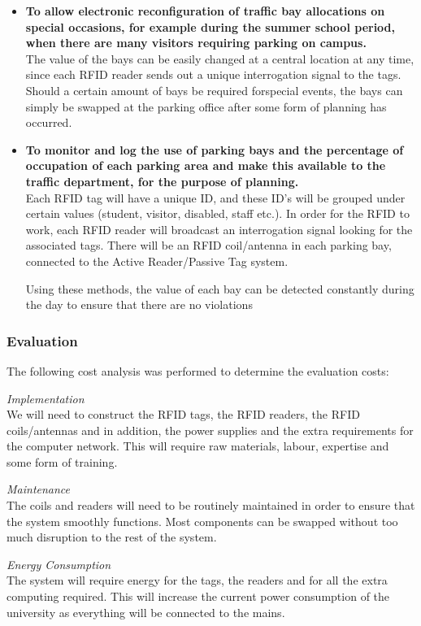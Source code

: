 \begin{itemize}
\item \textbf{To allow electronic reconfiguration  of  traffic  bay allocations on special occasions, for example during the summer school period, when there are many visitors requiring parking on campus.}\\
The value of the bays can be easily changed at a central location at any time, since each RFID reader
sends out a unique interrogation signal to the tags. Should a certain amount of bays be required forspecial events, the bays can simply be swapped at the parking office after some form of planning has
occurred.

\item \textbf{To monitor and log the use of parking bays and the percentage of occupation of each parking area and make this available to the traffic department, for the purpose of planning.}\\
Each RFID tag will have a unique ID, and these ID’s will be grouped under certain values (student,
visitor, disabled, staff etc.). In order for the RFID to work, each RFID reader will broadcast an
interrogation signal looking for the associated tags. There will be an RFID coil/antenna in each
parking bay, connected to the Active Reader/Passive Tag system.

Using these methods, the value of each bay can be detected constantly during the day to ensure that
there are no violations
\end{itemize}

\subsubsection{Evaluation}
The following cost analysis was performed to determine the evaluation costs:

\textit{Implementation}\\
We will need to construct the RFID tags, the RFID readers, the RFID coils/antennas and in addition,
the power supplies and the extra requirements for the computer network. This will require raw
materials, labour, expertise and some form of training.

\textit{Maintenance}\\
The coils and readers will need to be routinely maintained in order to ensure that the system
smoothly functions. Most components can be swapped without too much disruption to the rest of
the system.

\textit{Energy Consumption}\\
The system will require energy for the tags, the readers and for all the extra computing required.
This will increase the current power consumption of the university as everything will be connected
to the mains.

